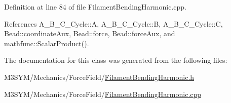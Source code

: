 Definition at line 84 of file Filament\+Bending\+Harmonic.\+cpp.



References A\+\_\+\+B\+\_\+\+C\+\_\+\+Cycle\+::\+A, A\+\_\+\+B\+\_\+\+C\+\_\+\+Cycle\+::\+B, A\+\_\+\+B\+\_\+\+C\+\_\+\+Cycle\+::\+C, Bead\+::coordinate\+Aux, Bead\+::force, Bead\+::force\+Aux, and mathfunc\+::\+Scalar\+Product().



The documentation for this class was generated from the following files\+:\begin{DoxyCompactItemize}
\item 
M3\+S\+Y\+M/\+Mechanics/\+Force\+Field/\hyperlink{FilamentBendingHarmonic_8h}{Filament\+Bending\+Harmonic.\+h}\item 
M3\+S\+Y\+M/\+Mechanics/\+Force\+Field/\hyperlink{FilamentBendingHarmonic_8cpp}{Filament\+Bending\+Harmonic.\+cpp}\end{DoxyCompactItemize}
